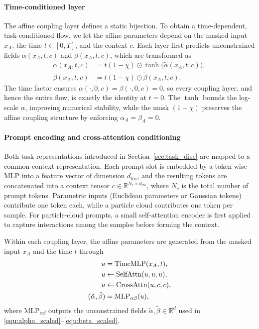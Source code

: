 \documentclass[preprint]{elsarticle}
\newcommand{\R}{\mathbb{R}}
\begin{document}
\paragraph{Time-conditioned layer}
The affine coupling layer defines a static bijection. To obtain a time-dependent, task-conditioned flow, we let the affine parameters depend on the masked input $x_A$, the time $t\in[0,T]$, and the context $c$. Each layer first predicts unconstrained fields $\tilde\alpha(x_A,t,c)$ and $\tilde\beta(x_A,t,c)$, which are transformed as
\begin{align}
    \alpha(x_A,t,c)
    &=t(1-\chi)\odot\tanh\bigl(\tilde\alpha(x_A,t,c)\bigr),
    \label{equ:alpha_scaled}\\
    \beta(x_A,t,c)
    &=t(1-\chi)\odot\tilde\beta(x_A,t,c).
    \label{equ:beta_scaled}
\end{align}
The time factor ensures $\alpha(\cdot,0,c)=\beta(\cdot,0,c)=0$, so every coupling layer, and hence the entire flow, is exactly the identity at $t=0$. The $\tanh$ bounds the log-scale $\alpha$, improving numerical stability, while the mask $(1-\chi)$ preserves the affine coupling structure by enforcing $\alpha_A=\beta_A=0$.

\paragraph{Prompt encoding and cross-attention conditioning}
Both task representations introduced in Section~\ref{sec:task_disc} are mapped to a common context representation. Each prompt slot is embedded by a token-wise MLP into a feature vector of dimension $d_{\mathrm{fea}}$, and the resulting tokens are concatenated into a context tensor $c\in\R^{N_c\times d_{\mathrm{fea}}}$, where $N_c$ is the total number of prompt tokens. Parametric inputs (Euclidean parameters or Gaussian tokens) contribute one token each, while a particle cloud contributes one token per sample. For particle-cloud prompts, a small self-attention encoder is first applied to capture interactions among the samples before forming the context.

Within each coupling layer, the affine parameters are generated from the masked input $x_A$ and the time $t$ through
\begin{align}
u &= \mathrm{TimeMLP}(x_A,t),\notag\\
u &\leftarrow \mathrm{SelfAttn}(u,u,u),\notag\\
u &\leftarrow \mathrm{CrossAttn}(u,c,c),\notag\\
(\tilde\alpha,\tilde\beta) &= \mathrm{MLP}_{\alpha\beta}(u),
\label{equ:layer_net}
\end{align}
where $\mathrm{MLP}_{\alpha\beta}$ outputs the unconstrained fields $\tilde\alpha,\tilde\beta\in\R^d$ used in
\eqref{equ:alpha_scaled}--\eqref{equ:beta_scaled}.
\end{document}
